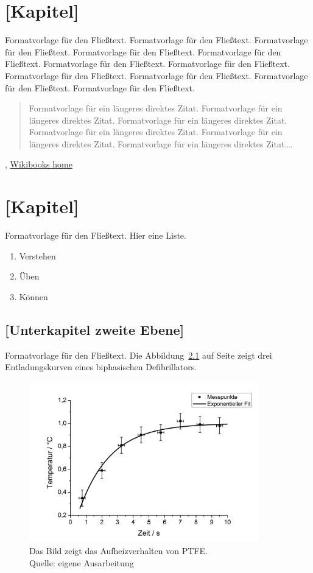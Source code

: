 \documentclass[a4paper,12pt,twoside]{scrreprt}
\begin{document}

\chapter{[Kapitel]}
Formatvorlage für den Fließtext. Formatvorlage für den Fließtext. Formatvorlage für den Fließtext. Formatvorlage für den Fließtext. Formatvorlage für den Fließtext. Formatvorlage für den Fließtext. Formatvorlage für den Fließtext. Formatvorlage für den Fließtext. Formatvorlage für den Fließtext. Formatvorlage für den Fließtext. Formatvorlage für den Fließtext.
\begin{quote}
  Formatvorlage für ein längeres direktes Zitat. Formatvorlage für ein längeres direktes Zitat. Formatvorlage für ein längeres direktes Zitat. Formatvorlage für ein längeres direktes Zitat. Formatvorlage für ein längeres direktes Zitat. Formatvorlage für ein längeres direktes Zitat….
\end{quote}

, \href{https://www.wikibooks.org}{Wikibooks home}

\chapter{[Kapitel]}
Formatvorlage für den Fließtext.
Hier eine Liste.
\begin{enumerate}
 \item Verstehen
 \item Üben
 \item Können
\end{enumerate}


\section{[Unterkapitel zweite Ebene]}
Formatvorlage für den Fließtext. Die Abbildung~\ref{fig:ex} auf Seite \pageref{fig:ex} zeigt drei Entladungskurven eines biphasischen Defibrillators.
\begin{figure}[htb]
  \centering
  \includegraphics[width=10cm]{Amann_TechnAbb}
  \caption[Aufheizverhalten von PTFE]{Das Bild zeigt das Aufheizverhalten von PTFE. \\Quelle: eigene Ausarbeitung}
 \label{fig:ex}
\end{figure}
\end{document}
